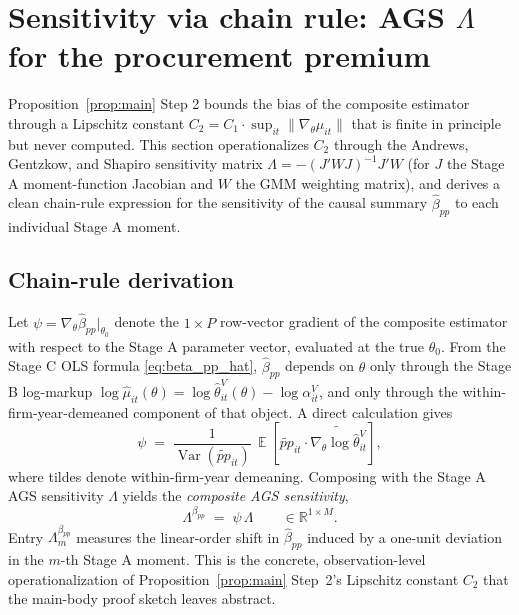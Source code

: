 \documentclass[11pt]{article}
\DeclareMathOperator{\E}{\mathbb{E}}
\DeclareMathOperator{\Var}{Var}
\begin{document}
\section{Sensitivity via chain rule: AGS $\Lambda$ for the procurement premium}\label{sec:ags_lambda}

Proposition~\ref{prop:main} Step 2 bounds the bias of the composite estimator through a Lipschitz constant $C_2 = C_1 \cdot \sup_{it}\|\nabla_\theta\mu_{it}\|$ that is finite in principle but never computed. This section operationalizes $C_2$ through the Andrews, Gentzkow, and Shapiro \cite{AGS2017} sensitivity matrix $\Lambda = -(J'WJ)^{-1}J'W$ (for $J$ the Stage A moment-function Jacobian and $W$ the GMM weighting matrix), and derives a clean chain-rule expression for the sensitivity of the causal summary $\hat\beta_{pp}$ to each individual Stage A moment.

\subsection{Chain-rule derivation}\label{sec:ags_chain}

Let $\psi = \nabla_\theta \hat\beta_{pp}\bigr|_{\theta_0}$ denote the $1 \times P$ row-vector gradient of the composite estimator with respect to the Stage A parameter vector, evaluated at the true $\theta_0$. From the Stage C OLS formula \eqref{eq:beta_pp_hat}, $\hat\beta_{pp}$ depends on $\theta$ only through the Stage B log-markup $\log\hat\mu_{it}(\theta) = \log\hat\theta^V_{it}(\theta) - \log\alpha^V_{it}$, and only through the within-firm-year-demeaned component of that object. A direct calculation gives
\begin{equation}\label{eq:psi_formula}
    \psi \;=\; \frac{1}{\Var(\widetilde{pp}_{it})}\,\E\!\left[\widetilde{pp}_{it}\cdot\widetilde{\nabla_\theta \log\hat\theta^V_{it}}\right],
\end{equation}
where tildes denote within-firm-year demeaning. Composing with the Stage A AGS sensitivity $\Lambda$ yields the \emph{composite AGS sensitivity},
\begin{equation}\label{eq:composite_lambda}
    \Lambda^{\beta_{pp}} \;=\; \psi\,\Lambda \qquad \in \mathbb{R}^{1\times M}.
\end{equation}
Entry $\Lambda^{\beta_{pp}}_m$ measures the linear-order shift in $\hat\beta_{pp}$ induced by a one-unit deviation in the $m$-th Stage A moment. This is the concrete, observation-level operationalization of Proposition~\ref{prop:main} Step~2's Lipschitz constant $C_2$ that the main-body proof sketch leaves abstract.
\end{document}
